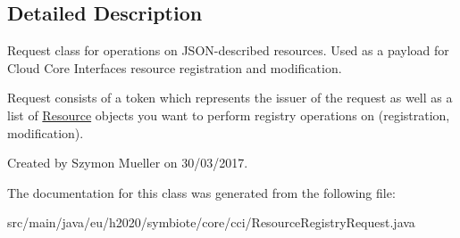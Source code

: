 \subsection{Detailed Description}
Request class for operations on J\+S\+O\+N-\/described resources. Used as a payload for Cloud Core Interface\textquotesingle{}s resource registration and modification.

Request consists of a token which represents the issuer of the request as well as a list of \hyperlink{}{Resource} objects you want to perform registry operations on (registration, modification).

Created by Szymon Mueller on 30/03/2017. 

The documentation for this class was generated from the following file\+:\begin{DoxyCompactItemize}
\item 
src/main/java/eu/h2020/symbiote/core/cci/Resource\+Registry\+Request.\+java\end{DoxyCompactItemize}
